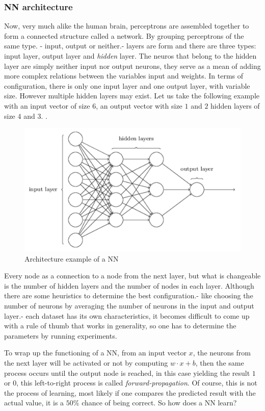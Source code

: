 \subsubsection{NN architecture }

Now, very much alike the human brain, perceptrons are assembled together to form a connected structure called a network. By grouping perceptrons of the same type. - input, output or neither.- layers are form and there are three types: input layer, output layer and \textit{hidden} layer. The neuros that belong to the hidden layer are simply neither input nor output neurons, they serve as a mean of adding more complex relations between the variables input and weights. In terms of configuration, there is only one input layer and one output layer, with variable size. However multiple hidden layers may exist. Let us take the following example with an input vector of size $6$, an output vector with size $1$ and $2$ hidden layers of size $4$ and $3$. \cite{nielsenneural}.


\begin{figure}[H]
	\centering
	\includegraphics[scale=0.5, width=0.65\linewidth]{figures/nnarch.png}
	\caption{Architecture example of a NN \cite{nielsenneural}}
	\label{nnarch}
\end{figure} 

Every node as a connection to a node from the next layer, but what is changeable is the number of hidden layers and the number of nodes in each layer. Although there are some heuristics to determine the best configuration.- like choosing the number of neurons by averaging the number of neurons in the input and output layer.-  each dataset has its own characteristics, it becomes difficult to come up with a rule of thumb that works in generality, so one has to determine the parameters by running experiments.\cite{nielsenneural}

To wrap up the functioning of a NN,  from an input vector $x$, the neurons from the next layer will be activated or not by computing $w \cdot x + b$, then the same process occurs until the output node is reached, in this case yielding the result $1$ or $0$, this left-to-right process is called \textit{forward-propagation}. Of course, this is not the process of learning, most likely if one compares the predicted result with the actual value, it is a $50 \%$ chance of being correct. So how does a NN learn?

